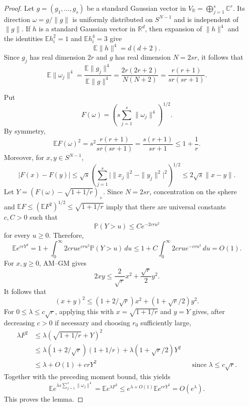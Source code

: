 \documentclass[11pt]{article}
\theoremstyle{remark}
\newcommand{\R}{\mathbb R}
\newcommand{\C}{\mathbb C}
\newcommand{\E}{\mathbb E}
\newcommand{\Prob}{\mathbb P}
\begin{document}
\begin{proof}
Let $g=(g_1,\dots,g_s)$ be a standard Gaussian vector in
$V_\R=\bigoplus_{j=1}^s\C^r$.  Its direction
$\omega=g/\|g\|$ is uniformly distributed on $S^{N-1}$ and is independent of
$\|g\|$.  If $h$ is a standard Gaussian vector in $\R^d$, then expansion of
$\|h\|^4$ and the identities $\E h_i^2=1$ and $\E h_i^4=3$ give
\[
        \E\|h\|^4=d(d+2).
\]
Since $g_j$ has real dimension $2r$ and $g$ has real dimension $N=2sr$, it
follows that
\[
        \E\|\omega_j\|^4
        =\frac{\E\|g_j\|^4}{\E\|g\|^4}
        =\frac{2r(2r+2)}{N(N+2)}
        =\frac{r(r+1)}{sr(sr+1)}.
\]

Put
\[
        F(\omega)=\left(s\sum_{j=1}^s\|\omega_j\|^4\right)^{1/2}.
\]
By symmetry,
\[
        \E F(\omega)^2
        =s^2\frac{r(r+1)}{sr(sr+1)}
        =\frac{s(r+1)}{sr+1}
        \le1+\frac1r.
\]
Moreover, for $x,y\in S^{N-1}$,
\[
        |F(x)-F(y)|
        \le \sqrt{s}\left(\sum_{j=1}^s
        \bigl|\|x_j\|^2-\|y_j\|^2\bigr|^2\right)^{1/2}
        \le2\sqrt{s}\|x-y\|.
\]
Let $Y=(F(\omega)-\sqrt{1+1/r})_+$.  Since $N=2sr$, concentration on the sphere and
$\E F\le(\E F^2)^{1/2}\le\sqrt{1+1/r}$ imply that there are universal
constants $c,C>0$ such that
\[
        \Prob(Y>u)\le C e^{-2cru^2}
\]
for every $u\ge0$.
Therefore,
\[
        \E e^{crY^2}
        =1+\int_0^\infty 2cru e^{cru^2}\Prob(Y>u)\,du
        \le1+C\int_0^\infty 2cru e^{-cru^2}\,du=O(1).
\]
For $x,y\ge0$, AM--GM gives
\[
        2xy\le\frac{2}{\sqrt r}x^2+\frac{\sqrt r}{2}y^2.
\]
It follows that
\[
        (x+y)^2\le(1+2/\sqrt r)x^2+(1+\sqrt r/2)y^2.
\]
For $0\le\lambda\le c\sqrt r$, applying this with
$x=\sqrt{1+1/r}$ and $y=Y$ gives, after decreasing
$c>0$ if necessary and choosing $r_0$ sufficiently
large,
\[
\begin{aligned}
        \lambda F^2
        &\le\lambda\left(\sqrt{1+1/r}+Y\right)^2 \\
        &\le\lambda(1+2/\sqrt r)(1+1/r)
        +\lambda(1+\sqrt r/2)Y^2 \\
        &\le\lambda+O(1)+crY^2
        && \text{since $\lambda\le c\sqrt r$}.
\end{aligned}
\]
Together with the preceding moment bound, this yields
\[
        \E e^{\lambda s\sum_{j=1}^s\|\omega_j\|^4}
        =\E e^{\lambda F^2}
        \le e^{\lambda+O(1)}\E e^{crY^2}
        =O(e^\lambda).
\]
This proves the lemma.
\end{proof}
\end{document}
